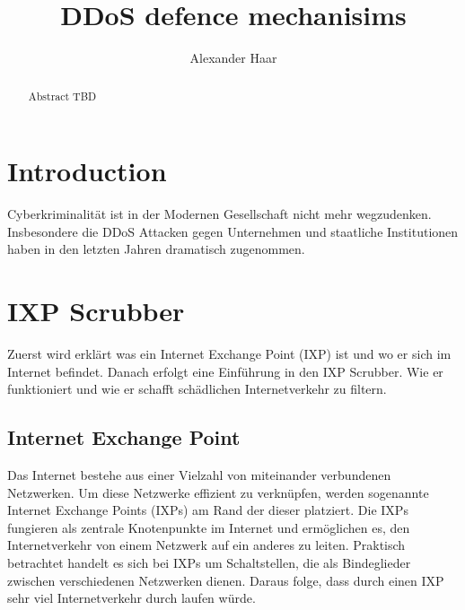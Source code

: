 \documentclass[sigplan,screen]{acmart}
\begin{document}
\title{DDoS defence mechanisims }

\author{Alexander Haar}

\begin{abstract}
  Abstract TBD
\end{abstract}



\maketitle

\section{Introduction}
Cyberkriminalität ist in der Modernen Gesellschaft nicht mehr wegzudenken. Insbesondere die DDoS Attacken gegen Unternehmen und staatliche Institutionen haben in den letzten Jahren dramatisch zugenommen.

\newpage
\section{IXP Scrubber}
Zuerst wird erklärt was ein Internet Exchange Point (IXP) ist und wo er sich im Internet befindet. Danach erfolgt eine Einführung in den IXP Scrubber. Wie er funktioniert und wie er schafft schädlichen Internetverkehr zu filtern.

\subsection{Internet Exchange Point}
Das Internet bestehe aus einer Vielzahl von miteinander verbundenen Netzwerken. Um diese Netzwerke effizient zu verknüpfen, werden sogenannte Internet Exchange Points (IXPs) am Rand der dieser platziert. Die IXPs fungieren als zentrale Knotenpunkte im Internet und ermöglichen es, den Internetverkehr von einem Netzwerk auf ein anderes zu leiten. Praktisch betrachtet handelt es sich bei IXPs um Schaltstellen, die als Bindeglieder zwischen verschiedenen Netzwerken dienen. Daraus folge, dass durch einen IXP sehr viel Internetverkehr durch laufen würde.
\end{document}
